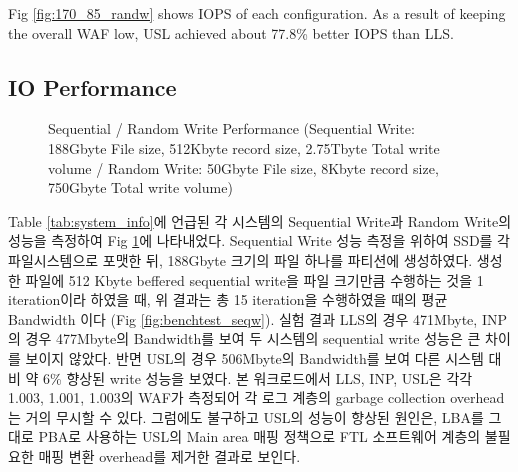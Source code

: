 \documentclass[letterpaper,twocolumn,10pt]{article}
\begin{document}
Fig \ref{fig:170_85_randw} shows IOPS of each configuration. As a result of keeping the overall WAF low, USL achieved about 77.8\% better IOPS than LLS.

\subsection{IO Performance}
\label{subsec:io_performance}

\begin{figure}[h]
\label{fig:benchtest}
\centering

\caption{Sequential / Random Write Performance (Sequential Write: 188Gbyte File size, 512Kbyte record size, 2.75Tbyte Total write volume / Random Write: 50Gbyte File size, 8Kbyte record size, 750Gbyte Total write volume)}
\end{figure}

Table \ref{tab:system_info}에 언급된 각 시스템의 Sequential Write과 Random Write의 성능을 측정하여 Fig \ref{fig:benchtest}에 나타내었다. Sequential Write 성능 측정을 위하여 SSD를 각 파일시스템으로 포맷한 뒤, 188Gbyte 크기의 파일 하나를 파티션에 생성하였다. 생성한 파일에 512 Kbyte beffered sequential write을 파일 크기만큼 수행하는 것을 1 iteration이라 하였을 때, 위 결과는 총 15 iteration을 수행하였을 때의 평균 Bandwidth 이다 (Fig \ref{fig:benchtest_seqw}). 실험 결과 LLS의 경우 471Mbyte, INP의 경우 477Mbyte의 Bandwidth를 보여 두 시스템의 sequential write 성능은 큰 차이를 보이지 않았다. 반면 USL의 경우 506Mbyte의 Bandwidth를 보여 다른 시스템 대비 약 6\% 향상된 write 성능을 보였다. 본 워크로드에서 LLS, INP, USL은 각각 1.003, 1.001, 1.003의 WAF가 측정되어 각 로그 계층의 garbage collection overhead는 거의 무시할 수 있다. 그럼에도 불구하고 USL의 성능이 향상된 원인은, LBA를 그대로 PBA로 사용하는 USL의 Main area 매핑 정책으로 FTL 소프트웨어 계층의 불필요한 매핑 변환 overhead를 제거한 결과로 보인다.
\end{document}
